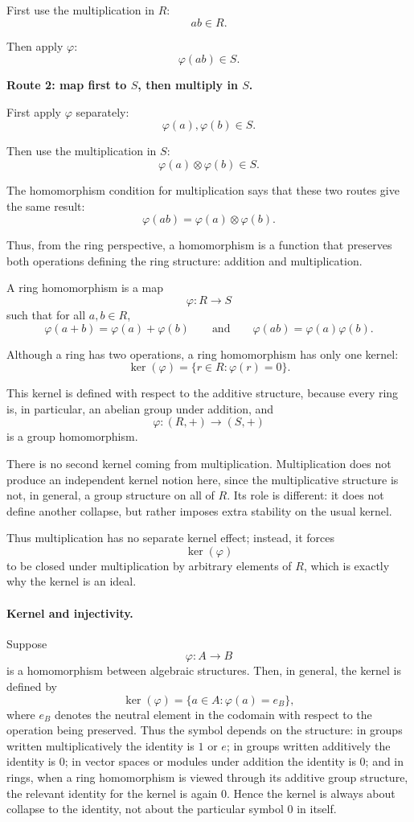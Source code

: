 \documentclass[12pt]{article}
\begin{document}
	First use the multiplication in \(R\):
	\[
	ab\in R.
	\]
	
	Then apply \(\varphi\):
	\[
	\varphi(ab)\in S.
	\]
	
	\medskip
	
	\textbf{Route 2: map first to \(S\), then multiply in \(S\).}
	
	First apply \(\varphi\) separately:
	\[
	\varphi(a),\varphi(b)\in S.
	\]
	
	Then use the multiplication in \(S\):
	\[
	\varphi(a)\otimes\varphi(b)\in S.
	\]
	
	\medskip
	
	The homomorphism condition for multiplication says that these two routes give the same result:
	\[
	\varphi(ab)=\varphi(a)\otimes\varphi(b).
	\]
	
	Thus, from the ring perspective, a homomorphism is a function that preserves both operations defining the ring structure: addition and multiplication.
	
	A ring homomorphism is a map
	\[
	\varphi:R\to S
	\]
	such that for all \(a,b\in R\),
	\[
	\varphi(a+b)=\varphi(a)+\varphi(b)
	\qquad\text{and}\qquad
	\varphi(ab)=\varphi(a)\varphi(b).
	\]
	
	Although a ring has two operations, a ring homomorphism has only one kernel:
	\[
	\ker(\varphi)=\{r\in R:\varphi(r)=0\}.
	\]
	
	This kernel is defined with respect to the additive structure, because every ring is, in particular, an abelian group under addition, and
	\[
	\varphi:(R,+)\to(S,+)
	\]
	is a group homomorphism.
	
	There is no second kernel coming from multiplication. Multiplication does not produce an independent kernel notion here, since the multiplicative structure is not, in general, a group structure on all of \(R\). Its role is different: it does not define another collapse, but rather imposes extra stability on the usual kernel.
	
	Thus multiplication has no separate kernel effect; instead, it forces
	\[
	\ker(\varphi)
	\]
	to be closed under multiplication by arbitrary elements of \(R\), which is exactly why the kernel is an ideal.
	
	\paragraph{Kernel and injectivity.}
	Suppose
	\[
	\varphi:A\to B
	\]
	is a homomorphism between algebraic structures. Then, in general, the kernel is defined by
	\[
	\ker(\varphi)=\{a\in A:\varphi(a)=e_B\},
	\]
	where \(e_B\) denotes the neutral element in the codomain with respect to the operation being preserved. Thus the symbol depends on the structure: in groups written multiplicatively the identity is \(1\) or \(e\); in groups written additively the identity is \(0\); in vector spaces or modules under addition the identity is \(0\); and in rings, when a ring homomorphism is viewed through its additive group structure, the relevant identity for the kernel is again \(0\). Hence the kernel is always about collapse to the identity, not about the particular symbol \(0\) in itself.
	
\end{document}

